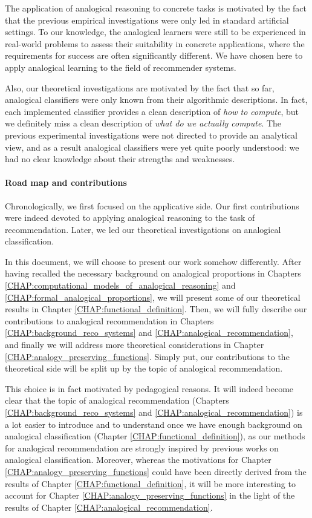 The application of analogical reasoning to concrete tasks is motivated by the
fact that the previous empirical investigations were only led in standard
artificial settings. To our knowledge, the analogical learners were still to be
experienced in real-world problems to assess their suitability in concrete
applications, where the requirements for success are often significantly
different. We have chosen here to apply analogical learning to the field of
recommender systems.

Also, our theoretical investigations are motivated by the fact that so far,
analogical classifiers were only known from their algorithmic descriptions.  In
fact, each implemented classifier provides a clean description of {\it how to
compute}, but we definitely miss a clean description of {\it what do we
actually compute}. The previous experimental investigations were not directed
to provide an analytical view, and as a result analogical classifiers were yet
quite poorly understood: we had no clear knowledge about their strengths and
weaknesses.

\paragraph{Road map and contributions\\}

Chronologically, we first focused on the applicative side. Our first
contributions were indeed devoted to applying analogical reasoning to the task
of recommendation. Later, we led our theoretical investigations on
analogical classification.

In this document, we will choose to present our work somehow differently.
After having recalled the necessary background on analogical proportions in
Chapters \ref{CHAP:computational_models_of_analogical_reasoning} and
\ref{CHAP:formal_analogical_proportions}, we
will present some of our
theoretical results in Chapter \ref{CHAP:functional_definition}. Then, we will
fully describe our contributions to analogical recommendation  in Chapters
\ref{CHAP:background_reco_systems} and \ref{CHAP:analogical_recommendation},
and finally we will address more theoretical considerations in Chapter
\ref{CHAP:analogy_preserving_functions}. Simply put, our contributions to the
theoretical side will be split up by the topic of analogical recommendation.

This choice is in fact motivated by pedagogical reasons. It will
indeed become clear that the topic of analogical recommendation (Chapters
\ref{CHAP:background_reco_systems} and \ref{CHAP:analogical_recommendation}) is
a lot easier to introduce and to understand once we have enough background on
analogical classification (Chapter
\ref{CHAP:functional_definition}), as our methods for analogical recommendation
are strongly inspired by previous works on analogical classification. Moreover,
whereas the motivations for Chapter \ref{CHAP:analogy_preserving_functions}
could have been directly derived from the results of Chapter
\ref{CHAP:functional_definition}, it will be more interesting to account for
Chapter \ref{CHAP:analogy_preserving_functions} in the light of the results of
Chapter \ref{CHAP:analogical_recommendation}.

